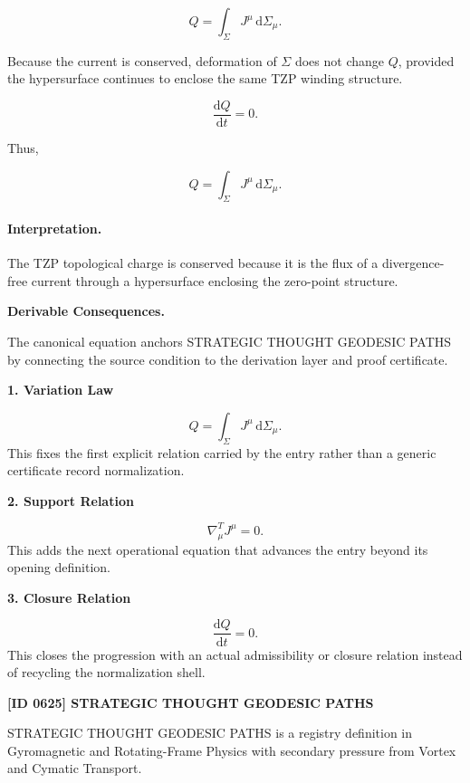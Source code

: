 \begin{equation}
Q
=
\int_{\Sigma}
J^\mu
\,\mathrm{d}\Sigma_\mu .
\end{equation}

Because the current is conserved, deformation of $\Sigma$ does not change $Q$, provided the hypersurface continues to enclose the same TZP winding structure.

\begin{equation}
\frac{\mathrm{d}Q}{\mathrm{d}t}=0 .
\end{equation}

Thus,

\begin{equation}
\boxed{
Q
=
\int_{\Sigma}
J^\mu
\,\mathrm{d}\Sigma_\mu .
}
\end{equation}

\paragraph{Interpretation.}
The TZP topological charge is conserved because it is the flux of a divergence-free current through a hypersurface enclosing the zero-point structure.

\par\vspace{0.35em}
\noindent\textbf{Derivable Consequences.}\quad
\begingroup
\footnotesize
\raggedright
The canonical equation anchors STRATEGIC THOUGHT GEODESIC PATHS by connecting the source condition to the derivation layer and proof certificate.
\par\endgroup

\noindent\textbf{1. Variation Law}\par
\[
Q = \int_{\Sigma} J^\mu \,\mathrm{d}\Sigma_\mu.
\]
\noindent This fixes the first explicit relation carried by the entry rather than a generic certificate record normalization.\par
\noindent\textbf{2. Support Relation}\par
\[
\nabla^T_\mu J^\mu = 0.
\]
\noindent This adds the next operational equation that advances the entry beyond its opening definition.\par
\noindent\textbf{3. Closure Relation}\par
\[
\frac{\mathrm{d}Q}{\mathrm{d}t}=0.
\]
\noindent This closes the progression with an actual admissibility or closure relation instead of recycling the normalization shell.\par

\clearpage
\noindent\textbf{[ID 0625] STRATEGIC THOUGHT GEODESIC PATHS}\par
\vspace{0.35em}
\begingroup\small
{}
STRATEGIC THOUGHT GEODESIC PATHS is a registry definition in Gyromagnetic and Rotating-Frame Physics with secondary pressure from Vortex and Cymatic Transport.

